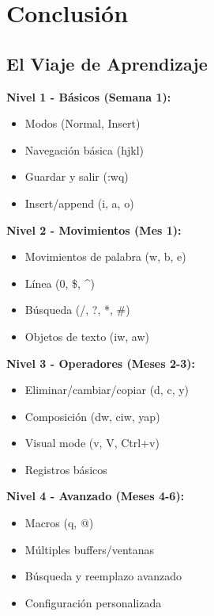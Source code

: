 \documentclass[
  doc,
  floatsintext,
  longtable,
  a4paper,
  nolmodern,
  notxfonts,
  notimes,
  12pt,
  colorlinks=true,linkcolor=blue,citecolor=blue,urlcolor=blue]{apa7}
\providecommand{\tightlist}{%
  \setlength{\itemsep}{0pt}\setlength{\parskip}{0pt}}
\begin{document}
\section{Conclusión}\label{conclusiuxf3n}

\subsection{El Viaje de Aprendizaje}\label{el-viaje-de-aprendizaje}

\textbf{Nivel 1 - Básicos (Semana 1):}

\begin{itemize}
\tightlist
\item
  Modos (Normal, Insert)
\item
  Navegación básica (hjkl)
\item
  Guardar y salir (:wq)
\item
  Insert/append (i, a, o)
\end{itemize}

\textbf{Nivel 2 - Movimientos (Mes 1):}

\begin{itemize}
\tightlist
\item
  Movimientos de palabra (w, b, e)
\item
  Línea (0, \$, \^{})
\item
  Búsqueda (/, ?, *, \#)
\item
  Objetos de texto (iw, aw)
\end{itemize}

\textbf{Nivel 3 - Operadores (Meses 2-3):}

\begin{itemize}
\tightlist
\item
  Eliminar/cambiar/copiar (d, c, y)
\item
  Composición (dw, ciw, yap)
\item
  Visual mode (v, V, Ctrl+v)
\item
  Registros básicos
\end{itemize}

\textbf{Nivel 4 - Avanzado (Meses 4-6):}

\begin{itemize}
\tightlist
\item
  Macros (q, @)
\item
  Múltiples buffers/ventanas
\item
  Búsqueda y reemplazo avanzado
\item
  Configuración personalizada
\end{itemize}
\end{document}
